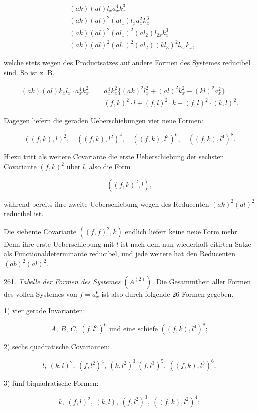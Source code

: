 \documentclass[11pt]{article}
\providecommand{\weberpage}[1]{}
\begin{document}
\[
\begin{aligned}
&(ak) (al) l_x a_x^4 k_x^3\\
&(ak) (al)^2 (al_1) l_x a_x^2 k_x^3\\
&(ak) (al)^2 (al_1)^2 (al_2) l_{2x} k_x^3\\
&(ak) (al)^2 (al_1)^2 (al_2) (kl_3)^2 l_{2x} k_x,
\end{aligned}
\]


\weberpage{283}
welche stets wegen des Productsatzes auf andere Formen des Systemes
reducibel sind. So ist z. B.

\[
\begin{aligned}
(ak) (al) k_x l_x \cdot a_x^4 k_x^2 &= a_x^4 k_x^2 \{(ak)^2 l_x^2 + (al)^2 k_x^2 - (kl)^2 a_x^2\}\\
&= (f, k)^2 \cdot l + (f, l)^2 \cdot k - (f, l)^2 \cdot (k, l)^2.
\end{aligned}
\]

Dagegen liefern die geraden Ueberschiebungen vier neue Formen:

\[
((f, k), l)^2, \quad ((f, k), l^2)^4, \quad ((f, k), l^3)^6, \quad ((f, k), l^4)^8.
\]

Hiezu tritt als weitere Covariante die erste Ueberschiebung der sechsten
Covariante $(f, k)^2$ über $l$, also die Form

\[
((f, k)^2, l),
\]

während bereits ihre zweite Ueberschiebung wegen des Reducenten
$(ak)^2 (al)^2$ reducibel ist.

Die siebente Covariante $((f, f)^2, k)$ endlich liefert keine neue Form
mehr. Denn ihre erste Ueberschiebung mit $l$ ist nach dem nun wiederholt
 citirten Satze als Functionaldeterminante reducibel, und jede
weitere hat den Reducenten $(ab)^2 (al)^2$.

261. \textit{Tabelle der Formen des Systemes $(A^{(2)})$.} Die Gesammtheit
aller Formen des vollen Systemes von $f = a_x^6$ ist also durch folgende
26 Formen gegeben.

1) vier gerade Invarianten:

\[
A, \ B, \ C, \ (f, l^3)^6 \text{ und eine schiefe } ((f, k), l^4)^8;
\]

2) sechs quadratische Covarianten:

\[
l, \ (k, l)^2, \ (f, l^2)^4, \ (k, l^2)^3 \ (f, l^3)^5, \ ((f, k), l^3)^6;
\]

3) fünf biquadratische Formen:

\[
k, \ (f, l)^2, \ (k, l), \ (f, l^2)^3, \ ((f, k), l^2)^4;
\]
\end{document}

